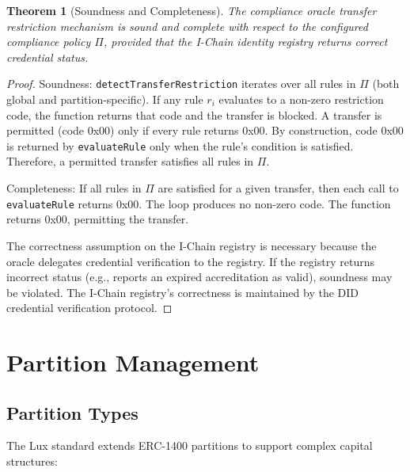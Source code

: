 \documentclass[11pt,a4paper]{article}
\newtheorem{theorem}{Theorem}
\begin{document}
\begin{theorem}[Soundness and Completeness]
The compliance oracle transfer restriction mechanism is sound and complete with respect to the configured compliance policy $\Pi$, provided that the I-Chain identity registry returns correct credential status.
\end{theorem}

\begin{proof}
Soundness: \texttt{detectTransferRestriction} iterates over all rules in $\Pi$ (both global and partition-specific). If any rule $r_i$ evaluates to a non-zero restriction code, the function returns that code and the transfer is blocked. A transfer is permitted (code 0x00) only if every rule returns 0x00. By construction, code 0x00 is returned by \texttt{evaluateRule} only when the rule's condition is satisfied. Therefore, a permitted transfer satisfies all rules in $\Pi$.

Completeness: If all rules in $\Pi$ are satisfied for a given transfer, then each call to \texttt{evaluateRule} returns 0x00. The loop produces no non-zero code. The function returns 0x00, permitting the transfer.

The correctness assumption on the I-Chain registry is necessary because the oracle delegates credential verification to the registry. If the registry returns incorrect status (e.g., reports an expired accreditation as valid), soundness may be violated. The I-Chain registry's correctness is maintained by the DID credential verification protocol.
\end{proof}

\section{Partition Management}\label{sec:partitions}

\subsection{Partition Types}

The Lux standard extends ERC-1400 partitions to support complex capital structures:
\end{document}
